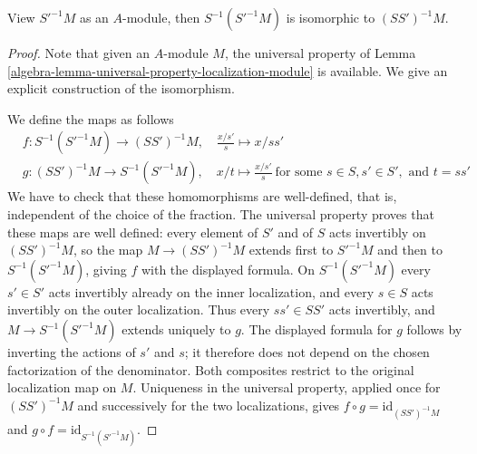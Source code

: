 \begin{proposition}
\label{editorial-source-proposition-localize-twice-module}
View $S'^{-1}M$ as an $A$-module, then $S^{-1}(S'^{-1}M)$ is
isomorphic to $(SS')^{-1}M$.
\end{proposition}

\begin{proof}
Note that given an $A$-module $M$, the universal property of
Lemma \ref{algebra-lemma-universal-property-localization-module} is available.
We give an explicit construction of the isomorphism.

\medskip\noindent
We define the maps as follows
\begin{align*}
& f : S^{-1}(S'^{-1}M) \longrightarrow (SS')^{-1}M, \quad \frac{x/s'}{s}\mapsto
x/ss'\\
& g : (SS')^{-1}M \longrightarrow S^{-1}(S'^{-1}M), \quad x/t\mapsto
\frac{x/s'}{s}\ \text{for some }s\in S, s'\in S', \text{ and }
t = ss'
\end{align*}
We have to check that these homomorphisms are well-defined, that is,
independent of the choice of the fraction. The universal property proves that these maps are well defined:
every element of $S'$ and of $S$ acts invertibly on $(SS')^{-1}M$,
so the map $M \to (SS')^{-1}M$ extends first to $S'^{-1}M$
and then to $S^{-1}(S'^{-1}M)$, giving $f$ with the displayed formula.
On $S^{-1}(S'^{-1}M)$ every $s' \in S'$ acts invertibly already
on the inner localization, and every $s \in S$ acts invertibly
on the outer localization. Thus every $ss' \in SS'$ acts invertibly,
and $M \to S^{-1}(S'^{-1}M)$ extends uniquely to $g$.
The displayed formula for $g$ follows by inverting the actions of
$s'$ and $s$; it therefore does not depend on the chosen factorization
of the denominator. Both composites restrict to the original
localization map on $M$. Uniqueness in the universal property,
applied once for $(SS')^{-1}M$ and successively for the two
localizations, gives $f \circ g = \mathrm{id}_{(SS')^{-1}M}$ and
$g \circ f = \mathrm{id}_{S^{-1}(S'^{-1}M)}$.
\end{proof}